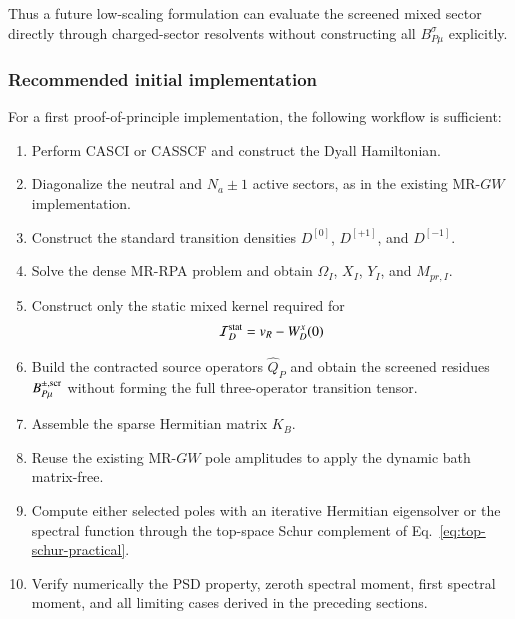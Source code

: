 \documentclass[aip,jcp,reprint,noshowkeys,superscriptaddress]{revtex4-1}
\begin{document}
Thus a future low-scaling formulation can evaluate the screened mixed
sector directly through charged-sector resolvents without constructing
all $B_{P\mu}^{\sigma}$ explicitly.


\subsubsection{Recommended initial implementation}

For a first proof-of-principle implementation, the following workflow
is sufficient:
\begin{enumerate}
  \item Perform CASCI or CASSCF and construct the Dyall Hamiltonian.

  \item Diagonalize the neutral and $N_a\pm1$ active sectors, as in the
  existing MR-$GW$ implementation.

  \item Construct the standard transition densities
  $D^{[0]}$, $D^{[+1]}$, and $D^{[-1]}$.

  \item Solve the dense MR-RPA problem and obtain
  $\Omega_I$, $X_I$, $Y_I$, and $M_{pr,I}$.

  \item Construct only the static mixed kernel required for
  \begin{equation}
    \mathcal I_D^{\rm stat}
    =
    v_R-W_D^x(0)
  \end{equation}

  \item Build the contracted source operators $\hat Q_P$ and obtain
  the screened residues $B_{P\mu}^{\pm,\rm scr}$ without forming the
  full three-operator transition tensor.

  \item Assemble the sparse Hermitian matrix $K_B$.

  \item Reuse the existing MR-$GW$ pole amplitudes to apply the dynamic
  bath matrix-free.

  \item Compute either selected poles with an iterative Hermitian
  eigensolver or the spectral function through the top-space Schur
  complement of Eq.~\eqref{eq:top-schur-practical}.

  \item Verify numerically the PSD property, zeroth spectral moment,
  first spectral moment, and all limiting cases derived in the
  preceding sections.
\end{enumerate}
\end{document}
